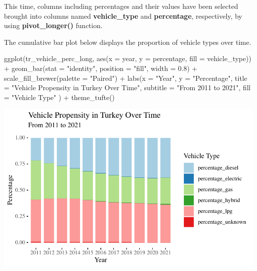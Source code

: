 \documentclass[
  11pt,
  a4paper,
  DIV=11,
  numbers=noendperiod]{scrartcl}
\newenvironment{Shaded}{\begin{snugshade}}{\end{snugshade}}
\newcommand{\AttributeTok}[1]{\textcolor[rgb]{0.40,0.45,0.13}{#1}}
\newcommand{\FloatTok}[1]{\textcolor[rgb]{0.68,0.00,0.00}{#1}}
\newcommand{\FunctionTok}[1]{\textcolor[rgb]{0.28,0.35,0.67}{#1}}
\newcommand{\NormalTok}[1]{\textcolor[rgb]{0.00,0.23,0.31}{#1}}
\newcommand{\SpecialCharTok}[1]{\textcolor[rgb]{0.37,0.37,0.37}{#1}}
\newcommand{\StringTok}[1]{\textcolor[rgb]{0.13,0.47,0.30}{#1}}
\begin{document}
This time, columns including percentages and their values have been
selected brought into columns named \textbf{vehicle\_type} and
\textbf{percentage}, respectively, by using \textbf{pivot\_longer()}
function.

The cumulative bar plot below displays the proportion of vehicle types
over time.

\begin{Shaded}
\begin{Highlighting}[]
\FunctionTok{ggplot}\NormalTok{(tr\_vehicle\_perc\_long, }\FunctionTok{aes}\NormalTok{(}\AttributeTok{x =}\NormalTok{ year, }\AttributeTok{y =}\NormalTok{ percentage,}
                                 \AttributeTok{fill =}\NormalTok{ vehicle\_type)) }\SpecialCharTok{+}
  \FunctionTok{geom\_bar}\NormalTok{(}\AttributeTok{stat =} \StringTok{"identity"}\NormalTok{, }\AttributeTok{position =} \StringTok{"fill"}\NormalTok{, }\AttributeTok{width =} \FloatTok{0.8}\NormalTok{) }\SpecialCharTok{+}
  \FunctionTok{scale\_fill\_brewer}\NormalTok{(}\AttributeTok{palette =} \StringTok{"Paired"}\NormalTok{) }\SpecialCharTok{+}
  \FunctionTok{labs}\NormalTok{(}\AttributeTok{x =} \StringTok{"Year"}\NormalTok{,}
       \AttributeTok{y =} \StringTok{"Percentage"}\NormalTok{,}
       \AttributeTok{title =} \StringTok{"Vehicle Propensity in Turkey Over Time"}\NormalTok{,}
       \AttributeTok{subtitle =} \StringTok{"From 2011 to 2021"}\NormalTok{,}
       \AttributeTok{fill =} \StringTok{"Vehicle Type"}
\NormalTok{  ) }\SpecialCharTok{+}
  \FunctionTok{theme\_tufte}\NormalTok{()}
\end{Highlighting}
\end{Shaded}

\includegraphics{analysis_files/figure-pdf/unnamed-chunk-21-1.pdf}
\end{document}
